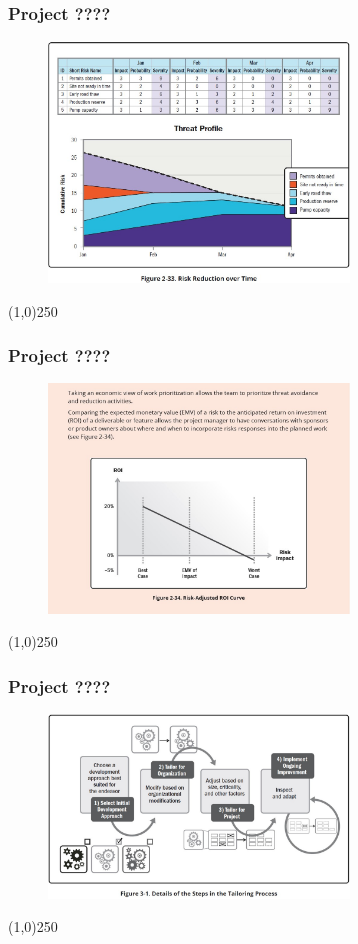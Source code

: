 \begin{frame}
\frametitle{Project ????}
 \begin{figure}
    \centering
        \includegraphics[width = 8cm]{../images/guide/Fig2-33.jpg}
    \label{guidefig:2-33}
 \end{figure}
\end{frame}
\begin{center}\line(1,0){250}\end{center}

\begin{frame}
\frametitle{Project ????}
 \begin{figure}
    \centering
        \includegraphics[width = 8cm]{../images/guide/Fig2-34.jpg}
    \label{guidefig:2-34}
 \end{figure}
\end{frame}
\begin{center}\line(1,0){250}\end{center}



\begin{frame}
\frametitle{Project ????}
 \begin{figure}
    \centering
        \includegraphics[width = 8cm]{../images/guide/Fig3-1.jpg}
    \label{guidefig:3-1}
 \end{figure}
\end{frame}
\begin{center}\line(1,0){250}\end{center}


